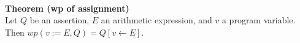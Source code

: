 \begin{multicols}{2}
\\
\textbf{Theorem (wp of assignment)}\\
Let $Q$ be an assertion, $E$ an arithmetic expression, and $v$ a program variable. Then $wp(v := E,Q) = Q[v \leftarrow E]$.



\end{multicols}